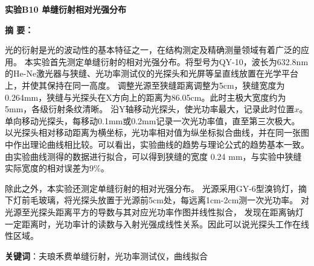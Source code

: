 \documentclass[12pt,a4paper,UTF8]{ctexart}
\begin{document}

\begin{center}
\LARGE\textbf{实验B10 单缝衍射相对光强分布}
\end{center}


\doublespacing
	\vspace{4em}
	{\bf 摘{} 要：}
	{ 光的衍射是光的波动性的基本特征之一，在结构测定及精确测量领域有着广泛的应用。
	本实验首先测定单缝衍射的相对光强分布。将型号为QY-10，波长为632.8nm的He-Ne激光器与狭缝、光功率测试仪的光探头和光屏等呈直线放置在光学平台上，并使其保持在同一高度。
	调整光源至狭缝距离调整为5cm，狭缝宽度为0.264mm，狭缝与光探头在X方向上的距离为86.05cm。此时主极大宽度约为5mm，各级衍射条纹清晰。
	沿Y轴移动光探头，使光功率最大，记录此时位置$x$。
	单向移动光探头，每移动0.1mm或0.2mm记录一次光功率值，直至第三次极大。
    以光探头相对移动距离为横坐标，光功率相对值为纵坐标拟合曲线，并在同一张图中作出理论曲线相比较。可以看出，实验曲线的趋势与理论公式的趋势基本一致。
	由实验曲线测得的数据进行拟合，可以得到狭缝的宽度 0.24  mm，与实验中狭缝实际宽度的相对误差为9\%。
	
	除此之外，本实验还测定单缝衍射的相对光强分布。
	光源采用GY-6型溴钨灯，摘下灯前毛玻璃，将光探头放置于光源前5cm处，每远离1cm-2cm测一次光功率。
	对光源至光探头距离平方的导数与其对应光功率作图并线性拟合，
	发现在距离钠灯一定距离时，光功率计的读数与入射光强成线性关系。因此可以说光探头工作在线性区域。}
	\par%
	\textbf{关键词}：夫琅禾费单缝衍射，光功率测试仪，曲线拟合
	\vspace{3em}

\newpage
\end{document}
